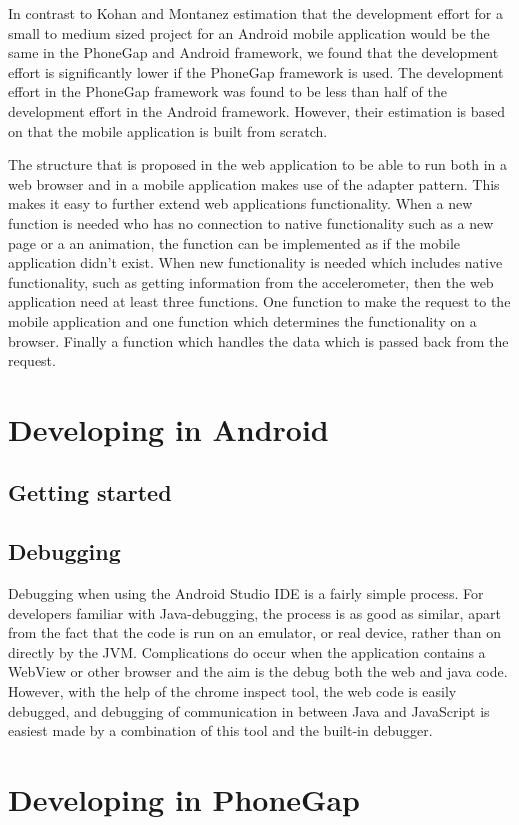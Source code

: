 In contrast to Kohan and Montanez estimation that the development effort for a small to medium sized project for an Android mobile application would be the same in the PhoneGap and Android framework, we found that the development effort is significantly lower if the PhoneGap framework is used. The development effort in the PhoneGap framework was found to be less than half of the development effort in the Android framework. However, their estimation is based on that the mobile application is built from scratch. 

The structure that is proposed in the web application to be able to run both in a web browser and in a mobile application makes use of the adapter pattern. This makes it easy to further extend web applications functionality. When a new function is needed who has no connection to native functionality such as a new page or a an animation, the function can be implemented as if the mobile application didn’t exist. When new functionality is needed which includes native functionality, such as getting information from the accelerometer, then the web application need at least three functions. One function to make the request to the mobile application and one function which determines the functionality on a browser. Finally a function which handles the data which is passed back from the request. 

\iffalse
\section{Developing in Android}
\subsection{Getting started}
\subsection{Debugging}
Debugging when using the Android Studio IDE is a fairly simple process. For developers familiar with Java-debugging, the process is as good as similar, apart from the fact that the code is run on an emulator, or real device, rather than on directly by the JVM. Complications do occur when the application contains a WebView or other browser and the aim is the debug both the web and java code. However, with the help of the chrome inspect tool, the web code is easily debugged, and debugging of communication in between Java and JavaScript is easiest made by a combination of this tool and the built-in debugger. 
\section{Developing in PhoneGap}
